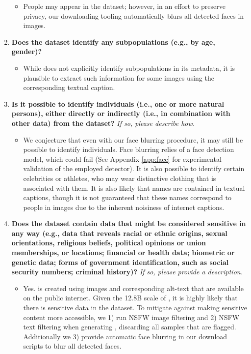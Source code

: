 \begin{enumerate}[label=Q\arabic*]
\begin{itemize}
\item People may appear in the dataset; however, in an effort to preserve privacy, our downloading tooling automatically blurs all detected faces in \pool images.
\end{itemize}

\item \textbf{Does the dataset identify any subpopulations (e.g., by age, gender)?}

\begin{itemize}
\item While \pool does not explicitly identify subpopulations in its metadata, it is plausible to extract such information for some images using the corresponding textual caption.
\end{itemize}

\item \textbf{Is it possible to identify individuals (i.e., one or more natural persons), either directly or indirectly (i.e., in combination with other data) from the dataset?} \textit{If so, please describe how.}

\begin{itemize}
\item We conjecture that even with our face blurring procedure, it may still be possible to identify individuals. Face blurring relies of a face detection model, which could fail (See Appendix \ref{app:face} for experimental validation of the employed detector). It is also possible to identify certain celebrities or athletes, who may wear distinctive clothing that is associated with them. It is also likely that names are contained in textual captions, though it is not guaranteed that these names correspond to people in images due to the inherent noisiness of internet captions.
\end{itemize}

\item \textbf{Does the dataset contain data that might be considered sensitive in any way (e.g., data that reveals racial or ethnic origins, sexual orientations, religious beliefs, political opinions or union memberships, or locations; financial or health data; biometric or genetic data; forms of government identification, such as social security numbers; criminal history)?} \textit{If so, please provide a description.}

\begin{itemize}
\item Yes. \pool is created using images and corresponding alt-text that are available on the public internet. Given the 12.8B scale of \pool, it is highly likely that there is sensitive data in the dataset. To mitigate against making sensitive content more accessible, we 1) run NSFW image filtering and 2) NSFW text filtering when generating \pool, discarding all samples that are flagged. Additionally we 3) provide automatic face blurring in our \pool download scripts to blur all detected faces.
\end{itemize}


\end{enumerate}
